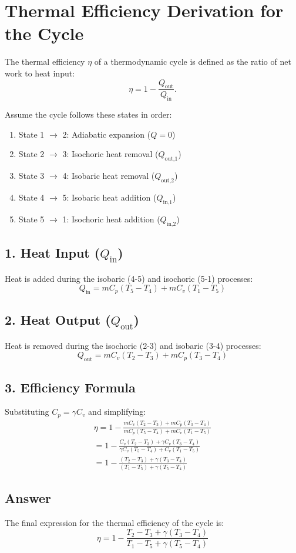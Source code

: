 \documentclass[12pt]{article}
\begin{document}
\section*{Thermal Efficiency Derivation for the Cycle}

The thermal efficiency $\eta$ of a thermodynamic cycle is defined as the ratio of net work to heat input:
\begin{equation}
\eta = 1 - \frac{Q_{\text{out}}}{Q_{\text{in}}}.
\end{equation}

Assume the cycle follows these states in order:

\begin{enumerate}
    \item State 1 $\rightarrow$ 2: Adiabatic expansion ($Q = 0$)
    \item State 2 $\rightarrow$ 3: Isochoric heat removal ($Q_{\text{out,1}}$)
    \item State 3 $\rightarrow$ 4: Isobaric heat removal ($Q_{\text{out,2}}$)
    \item State 4 $\rightarrow$ 5: Isobaric heat addition ($Q_{\text{in,1}}$)
    \item State 5 $\rightarrow$ 1: Isochoric heat addition ($Q_{\text{in,2}}$)
\end{enumerate}

\subsection*{1. Heat Input ($Q_{\text{in}}$)}
Heat is added during the isobaric (4-5) and isochoric (5-1) processes:
\begin{equation}
Q_{\text{in}} = m C_p (T_5 - T_4) + m C_v (T_1 - T_5)
\end{equation}

\subsection*{2. Heat Output ($Q_{\text{out}}$)}
Heat is removed during the isochoric (2-3) and isobaric (3-4) processes:
\begin{equation}
Q_{\text{out}} = m C_v (T_2 - T_3) + m C_p (T_3 - T_4)
\end{equation}

\subsection*{3. Efficiency Formula}
Substituting $C_p = \gamma C_v$ and simplifying:
\begin{align}
\eta = 1 - \frac{m C_v (T_2 - T_3) + m C_p (T_3 - T_4)}{m C_p (T_5 - T_4) + m C_v (T_1 - T_5)} \\
= 1 - \frac{C_v (T_2 - T_3) + \gamma C_v (T_3 - T_4)}{\gamma C_v (T_5 - T_4) + C_v (T_1 - T_5)} \\
= 1 - \frac{(T_2 - T_3) + \gamma (T_3 - T_4)}{(T_1 - T_5) + \gamma (T_5 - T_4)}
\end{align}

\subsection*{Answer}
The final expression for the thermal efficiency of the cycle is:
\begin{equation}
\eta = 1 - \frac{T_2 - T_3 + \gamma (T_3 - T_4)}{T_1 - T_5 + \gamma (T_5 - T_4)}
\end{equation}
\end{document}
